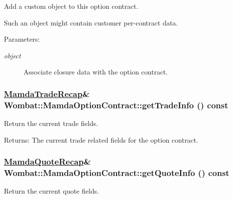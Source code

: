 Add a custom object to this option contract. 

Such an object might contain customer per-contract data.

\begin{Desc}
\item[Parameters:]
\begin{description}
\item[{\em object}]Associate closure data with the option contract. \end{description}
\end{Desc}
\hypertarget{classWombat_1_1MamdaOptionContract_e360b5e6125af8ad145f2b4a36026d83}{
\subsubsection[getTradeInfo]{\setlength{\rightskip}{0pt plus 5cm}\hyperlink{classWombat_1_1MamdaTradeRecap}{Mamda\-Trade\-Recap}\& Wombat::Mamda\-Option\-Contract::get\-Trade\-Info () const}}
\label{classWombat_1_1MamdaOptionContract_e360b5e6125af8ad145f2b4a36026d83}


Return the current trade fields. 

\begin{Desc}
\item[Returns:]The current trade related fields for the option contract. \end{Desc}
\hypertarget{classWombat_1_1MamdaOptionContract_722ecf29d9ca868a8005ee3bf97530f9}{
\subsubsection[getQuoteInfo]{\setlength{\rightskip}{0pt plus 5cm}\hyperlink{classWombat_1_1MamdaQuoteRecap}{Mamda\-Quote\-Recap}\& Wombat::Mamda\-Option\-Contract::get\-Quote\-Info () const}}
\label{classWombat_1_1MamdaOptionContract_722ecf29d9ca868a8005ee3bf97530f9}


Return the current quote fields. 

